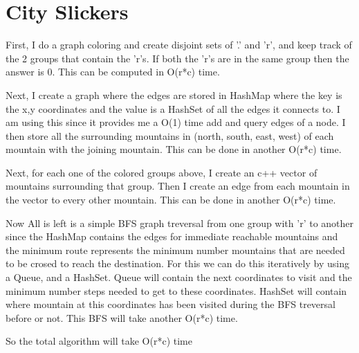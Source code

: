 \documentclass{article}
\begin{document}
\section{City Slickers}
First, I do a graph coloring and create disjoint sets of '.' and 'r', and keep track of the 2 groups that contain the 'r's. If both the 'r's are in the same group then the answer is 0. This can be computed in O(r*c) time.
\par
Next, I create a graph where the edges are stored in HashMap where the key is the x,y coordinates and the value is a HashSet of all the edges it connects to. I am using this since it provides me a O(1) time add and query edges of a node. I then store all the surrounding mountains in (north, south, east, west) of each mountain with the joining mountain. This can be done in another O(r*c) time.
\par
Next, for each one of the colored groups above, I create an c++ vector of mountains surrounding that group. Then I create an edge from each mountain in the vector to every other mountain. This can be done in another O(r*c) time.
\par
Now All is left is a simple BFS graph treversal from one group with 'r' to another since the HashMap contains the edges for immediate reachable mountains and the minimum route represents the minimum number mountains that are needed to be crosed to reach the destination. For this we can do this iteratively by using a Queue, and a HashSet. Queue will contain the next coordinates to visit and the minimum number steps needed to get to these coordinates. HashSet will contain where mountain at this coordinates has been visited during the BFS treversal before or not. This BFS will take another O(r*c) time.
\par
So the total algorithm will take O(r*c) time
\end{document}
